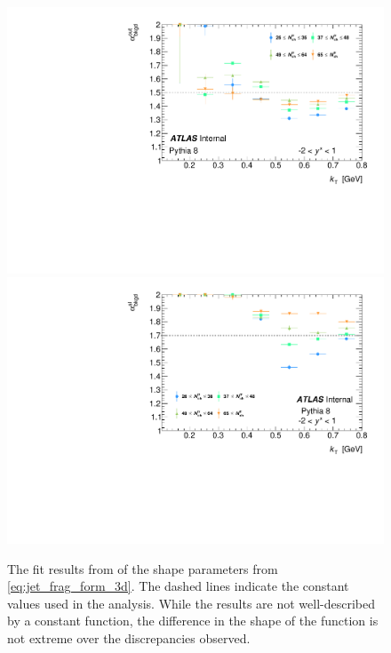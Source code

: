 \begin{figure}[t]
\begin{minipage}[t]{1.0\textwidth}
\centering
\includegraphics[width=.49\linewidth]{canqosl_backAlphaOut_vs_kt.pdf}
\includegraphics[width=.49\linewidth]{canqosl_backAlpha_vs_kt.pdf}\\
\end{minipage}
\caption{The fit results from  of the shape parameters from \cref{eq:jet_frag_form_3d}. The dashed lines indicate the constant values used in the analysis. While the results are not well-described by a constant function, the difference in the shape of the function is not extreme over the discrepancies observed.}
\label{fig:pythia_bkgd_alpha}
\end{figure}


